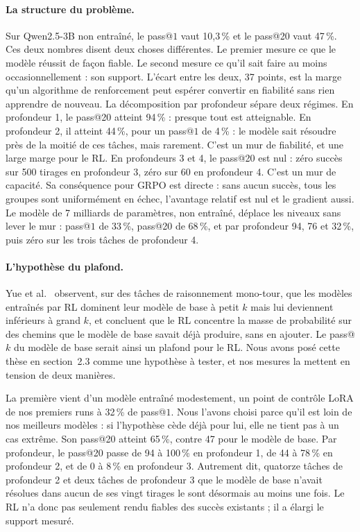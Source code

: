 \documentclass[11pt,a4paper]{article}
\begin{document}
\paragraph{La structure du problème.} Sur Qwen2.5-3B non entraîné, le pass@$1$ vaut 10{,}3\,\% et le pass@20 vaut 47\,\%. Ces deux nombres disent deux choses différentes. Le premier mesure ce que le modèle réussit de façon fiable. Le second mesure ce qu'il sait faire au moins occasionnellement : son support. L'écart entre les deux, 37 points, est la marge qu'un algorithme de renforcement peut espérer convertir en fiabilité sans rien apprendre de nouveau. La décomposition par profondeur sépare deux régimes. En profondeur 1, le pass@20 atteint 94\,\% : presque tout est atteignable. En profondeur 2, il atteint 44\,\%, pour un pass@$1$ de 4\,\% : le modèle sait résoudre près de la moitié de ces tâches, mais rarement. C'est un mur de fiabilité, et une large marge pour le RL. En profondeurs 3 et 4, le pass@20 est nul : zéro succès sur 500 tirages en profondeur 3, zéro sur 60 en profondeur 4. C'est un mur de capacité. Sa conséquence pour GRPO est directe : sans aucun succès, tous les groupes sont uniformément en échec, l'avantage relatif est nul et le gradient aussi. Le modèle de 7 milliards de paramètres, non entraîné, déplace les niveaux sans lever le mur : pass@$1$ de 33\,\%, pass@20 de 68\,\%, et par profondeur 94, 76 et 32\,\%, puis zéro sur les trois tâches de profondeur 4.

\paragraph{L'hypothèse du plafond.} Yue et al.~\cite{yue2025rlvr} observent, sur des tâches de raisonnement mono-tour, que les modèles entraînés par RL dominent leur modèle de base à petit $k$ mais lui deviennent inférieurs à grand $k$, et concluent que le RL concentre la masse de probabilité sur des chemins que le modèle de base savait déjà produire, sans en ajouter. Le pass@$k$ du modèle de base serait ainsi un plafond pour le RL. Nous avons posé cette thèse en section~2.3 comme une hypothèse à tester, et nos mesures la mettent en tension de deux manières.

La première vient d'un modèle entraîné modestement, un point de contrôle LoRA de nos premiers runs à 32\,\% de pass@$1$. Nous l'avons choisi parce qu'il est loin de nos meilleurs modèles : si l'hypothèse cède déjà pour lui, elle ne tient pas à un cas extrême. Son pass@20 atteint 65\,\%, contre 47 pour le modèle de base. Par profondeur, le pass@20 passe de 94 à 100\,\% en profondeur 1, de 44 à 78\,\% en profondeur 2, et de 0 à 8\,\% en profondeur 3. Autrement dit, quatorze tâches de profondeur 2 et deux tâches de profondeur 3 que le modèle de base n'avait résolues dans aucun de ses vingt tirages le sont désormais au moins une fois. Le RL n'a donc pas seulement rendu fiables des succès existants ; il a élargi le support mesuré.
\end{document}
